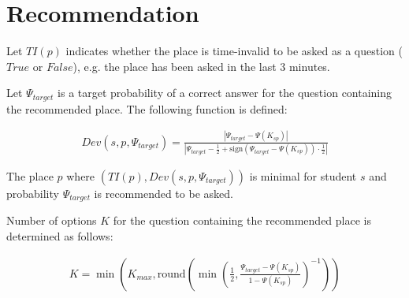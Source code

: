 \documentclass[a4paper]{article}
\begin{document}
\section{Recommendation}

Let $TI(p)$ indicates whether the place is time-invalid to be asked as a question ($True$ or $False$), e.g. the place has been asked in the last 3 minutes.

Let $\Psi_{target}$ is a target probability of a correct answer for the question containing the recommended place. The following function is defined:

\begin{align}
Dev(s, p, \Psi_{target}) = \frac{\left|\Psi_{target} - \Psi(K_{sp})\right|}{\left|\Psi_{target} - \frac{1}{2} + \textrm{sign}\left(\Psi_{target} - \Psi(K_{sp})\right) \cdot \frac{1}{2}\right|}
\end{align}

The place $p$ where $\left(TI(p), Dev(s, p, \Psi_{target})\right)$ is minimal for student $s$ and
probability $\Psi_{target}$ is recommended to be asked.

Number of options $K$ for the question containing the recommended place is determined as follows:

\begin{align}
K = \min\left(K_{max}, \textrm{round}\left(\min\left(\frac{1}{2}, \frac{\Psi_{target} - \Psi(K_{sp})}{1 - \Psi(K_{sp})}\right)^{-1}\right)\right)
\end{align}
\end{document}
